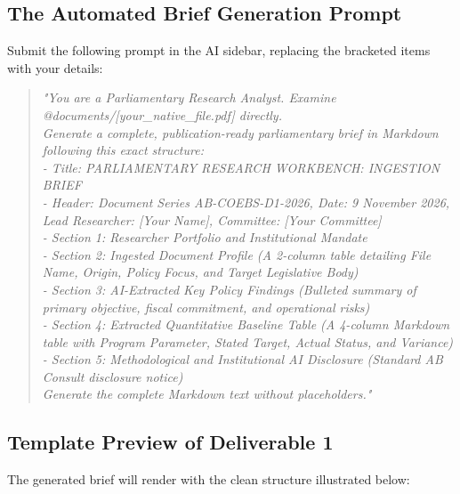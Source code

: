 \documentclass[11pt, a4paper]{report}
\begin{document}
\subsection{The Automated Brief Generation Prompt}
Submit the following prompt in the AI sidebar, replacing the bracketed items with your details:
\begin{quote}
\small
\textit{"You are a Parliamentary Research Analyst. Examine @documents/[your\_native\_file.pdf] directly. \\
Generate a complete, publication-ready parliamentary brief in Markdown following this exact structure: \\
- Title: PARLIAMENTARY RESEARCH WORKBENCH: INGESTION BRIEF \\
- Header: Document Series AB-COEBS-D1-2026, Date: 9 November 2026, Lead Researcher: [Your Name], Committee: [Your Committee] \\
- Section 1: Researcher Portfolio and Institutional Mandate \\
- Section 2: Ingested Document Profile (A 2-column table detailing File Name, Origin, Policy Focus, and Target Legislative Body) \\
- Section 3: AI-Extracted Key Policy Findings (Bulleted summary of primary objective, fiscal commitment, and operational risks) \\
- Section 4: Extracted Quantitative Baseline Table (A 4-column Markdown table with Program Parameter, Stated Target, Actual Status, and Variance) \\
- Section 5: Methodological and Institutional AI Disclosure (Standard AB Consult disclosure notice) \\
Generate the complete Markdown text without placeholders."}
\end{quote}

\subsection{Template Preview of Deliverable 1}
The generated brief will render with the clean structure illustrated below:
\end{document}
